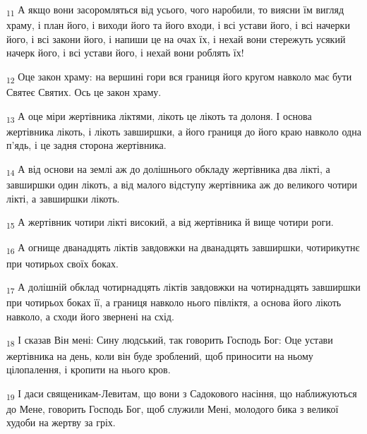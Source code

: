 \begin{tcolorbox}
\textsubscript{11} А якщо вони засоромляться від усього, чого наробили, то виясни їм вигляд храму, і план його, і виходи його та його входи, і всі устави його, і всі начерки його, і всі закони його, і напиши це на очах їх, і нехай вони стережуть усякий начерк його, і всі устави його, і нехай вони роблять їх!
\end{tcolorbox}
\begin{tcolorbox}
\textsubscript{12} Оце закон храму: на вершині гори вся границя його кругом навколо має бути Святеє Святих. Ось це закон храму.
\end{tcolorbox}
\begin{tcolorbox}
\textsubscript{13} А оце міри жертівника ліктями, лікоть це лікоть та долоня. І основа жертівника лікоть, і лікоть завширшки, а його границя до його краю навколо одна п'ядь, і це задня сторона жертівника.
\end{tcolorbox}
\begin{tcolorbox}
\textsubscript{14} А від основи на землі аж до долішнього обкладу жертівника два лікті, а завширшки один лікоть, а від малого відступу жертівника аж до великого чотири лікті, а завширшки лікоть.
\end{tcolorbox}
\begin{tcolorbox}
\textsubscript{15} А жертівник чотири лікті високий, а від жертівника й вище чотири роги.
\end{tcolorbox}
\begin{tcolorbox}
\textsubscript{16} А огнище дванадцять ліктів завдовжки на дванадцять завширшки, чотирикутнє при чотирьох своїх боках.
\end{tcolorbox}
\begin{tcolorbox}
\textsubscript{17} А долішній обклад чотирнадцять ліктів завдовжки на чотирнадцять завширшки при чотирьох боках її, а границя навколо нього півліктя, а основа його лікоть навколо, а сходи його звернені на схід.
\end{tcolorbox}
\begin{tcolorbox}
\textsubscript{18} І сказав Він мені: Сину людський, так говорить Господь Бог: Оце устави жертівника на день, коли він буде зроблений, щоб приносити на ньому цілопалення, і кропити на нього кров.
\end{tcolorbox}
\begin{tcolorbox}
\textsubscript{19} І даси священикам-Левитам, що вони з Садокового насіння, що наближуються до Мене, говорить Господь Бог, щоб служили Мені, молодого бика з великої худоби на жертву за гріх.
\end{tcolorbox}
